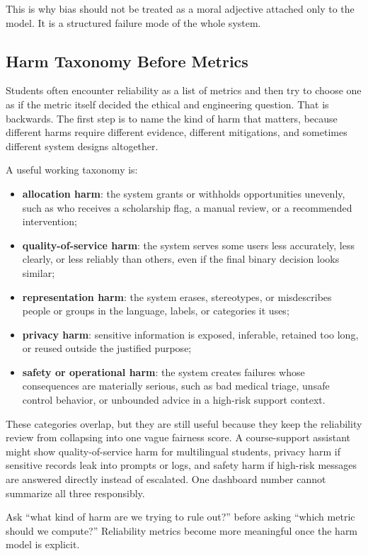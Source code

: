 This is why bias should not be treated as a moral adjective attached only to the model. It is a structured failure mode of the whole system.

\subsection{Harm Taxonomy Before Metrics}

Students often encounter reliability as a list of metrics and then try to choose one as if the metric itself decided the ethical and engineering question. That is backwards. The first step is to name the kind of harm that matters, because different harms require different evidence, different mitigations, and sometimes different system designs altogether.

A useful working taxonomy is:
\begin{itemize}[leftmargin=*]
\item \textbf{allocation harm}: the system grants or withholds opportunities unevenly, such as who receives a scholarship flag, a manual review, or a recommended intervention;
\item \textbf{quality-of-service harm}: the system serves some users less accurately, less clearly, or less reliably than others, even if the final binary decision looks similar;
\item \textbf{representation harm}: the system erases, stereotypes, or misdescribes people or groups in the language, labels, or categories it uses;
\item \textbf{privacy harm}: sensitive information is exposed, inferable, retained too long, or reused outside the justified purpose;
\item \textbf{safety or operational harm}: the system creates failures whose consequences are materially serious, such as bad medical triage, unsafe control behavior, or unbounded advice in a high-risk support context.
\end{itemize}

These categories overlap, but they are still useful because they keep the reliability review from collapsing into one vague fairness score. A course-support assistant might show quality-of-service harm for multilingual students, privacy harm if sensitive records leak into prompts or logs, and safety harm if high-risk messages are answered directly instead of escalated. One dashboard number cannot summarize all three responsibly.

\begin{practicalnote}
Ask ``what kind of harm are we trying to rule out?'' before asking ``which metric should we compute?'' Reliability metrics become more meaningful once the harm model is explicit.
\end{practicalnote}

